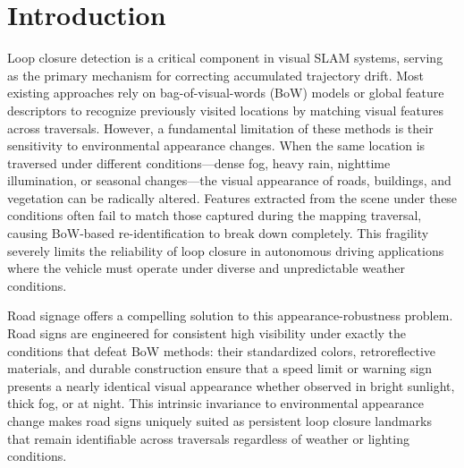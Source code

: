\documentclass[runningheads]{llncs}
\begin{document}


\section{Introduction}

Loop closure detection is a critical component in visual SLAM systems, serving as the primary
mechanism for correcting accumulated trajectory drift. Most existing approaches rely on
bag-of-visual-words (BoW) models or global feature descriptors to recognize previously visited
locations by matching visual features across traversals. However, a fundamental limitation of
these methods is their sensitivity to environmental appearance changes. When the same location
is traversed under different conditions---dense fog, heavy rain, nighttime illumination, or
seasonal changes---the visual appearance of roads, buildings, and vegetation can be radically
altered. Features extracted from the scene under these conditions often fail to match those
captured during the mapping traversal, causing BoW-based re-identification to break down
completely. This fragility severely limits the reliability of loop closure in autonomous driving
applications where the vehicle must operate under diverse and unpredictable weather conditions.

Road signage offers a compelling solution to this appearance-robustness problem. Road signs
are engineered for consistent high visibility under exactly the conditions that defeat BoW methods:
their standardized colors, retroreflective materials, and durable construction ensure that a speed
limit or warning sign presents a nearly identical visual appearance whether observed in bright
sunlight, thick fog, or at night. This intrinsic invariance to environmental appearance change
makes road signs uniquely suited as persistent loop closure landmarks that remain identifiable
across traversals regardless of weather or lighting conditions.
\end{document}
